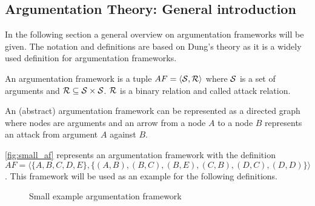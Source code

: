 \subsection{Argumentation Theory: General introduction}
In the following section a general overview on argumentation frameworks will be given. The notation and definitions are based on Dung's theory \cite{dung1995} as it is a widely used definition for argumentation frameworks.
\begin{definition}
	An argumentation framework is a tuple $AF = \langle \S, \R \rangle$ where $\S$ is a set of arguments and $ \R \subseteq \S \times \S$. $\R$ is a binary relation and called attack relation.
\end{definition}


An (abstract) argumentation framework can be represented as a directed graph where nodes are arguments and an arrow from a node $A$ to a node $B$ represents an attack from argument $A$ against $B$.

\begin{exa}
 \autoref{fig:small_af} represents an argumentation framework with the definition $AF = \langle \{A, B, C, D, E\}, \{(A,B), (B, C), (B, E), (C, B), (D,C), (D,D)\}\rangle$. This framework will be used as an example for the following definitions.
\end{exa}


\begin{figure}[h]
\centering
{}
\caption{Small example argumentation framework}
\label{fig:small_af}
\end{figure}


